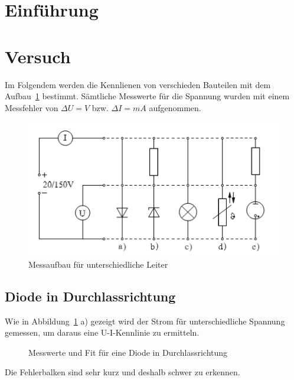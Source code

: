 \section{Einführung}
\section{Versuch}
Im Folgendem werden die Kennlienen von verschieden Bauteilen mit dem Aufbau~\ref{fig:aufbau} bestimmt. Sämtliche Messwerte für die Spannung wurden mit einem Messfehler von $\Delta U = V$ bzw. $\Delta I = mA$ aufgenommen.
\begin{figure}[H]
	\centering
	\includegraphics[width=.8\textwidth]{Aufbau.png}
	\caption{Messaufbau für unterschiedliche Leiter}
	\label{fig:aufbau}
\end{figure}
\subsection{Diode in Durchlassrichtung}
Wie in Abbildung~\ref{fig:aufbau} a) gezeigt wird der Strom für unterschiedliche Spannung gemessen, um daraus eine U-I-Kennlinie zu ermitteln.

\begin{figure}[H]
\centering
{}
\caption{Messwerte und Fit für eine Diode in Durchlassrichtung}
\label{fig:diode}
\end{figure}
Die Fehlerbalken sind sehr kurz und deshalb schwer zu erkennen.

